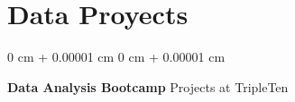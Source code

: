 \documentclass[10pt, a4paper]{article}
\newenvironment{onecolentry}{
    \begin{adjustwidth}{
        0 cm + 0.00001 cm
    }{
        0 cm + 0.00001 cm
    }
}{
    \end{adjustwidth}
} %
\newenvironment{twocolentry}[2][]{
    \onecolentry
    \def\secondColumn{#2}
    \setcolumnwidth{\fill, 4.5 cm}
    \begin{paracol}{2}
}{
    \switchcolumn \raggedleft \secondColumn
    \end{paracol}
    \endonecolentry
} %
\begin{document}
        \vspace{0.2 cm}




        \section{Data Proyects}

    \begin{twocolentry}{
            Projects at TripleTen 
        }
            \textbf{Data Analysis Bootcamp}\end{twocolentry}
\end{document}
